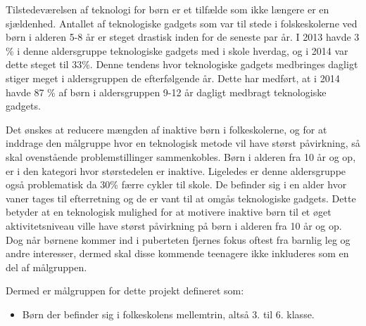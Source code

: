 Tilstedeværelsen af teknologi for børn er et tilfælde som ikke længere er en sjældenhed. Antallet af teknologiske gadgets som var til stede i folskeskolerne ved børn i alderen 5-8 år er steget drastisk inden for de seneste par år. I 2013 havde 3 \% i denne aldersgruppe teknologiske gadgets med i skole hverdag, og i 2014 var dette steget til 33\%. Denne tendens hvor teknologiske gadgets medbringes dagligt stiger meget i aldersgruppen de efterfølgende år. Dette har medført, at i 2014 havde 87 \% af børn i aldersgruppen 9-12 år dagligt medbragt teknologiske gadgets. \citep{GjensidigeForsikring2014}

Det ønskes at reducere mængden af inaktive børn i folkeskolerne, og for at inddrage den målgruppe hvor en teknologisk metode vil have størst påvirkning, så skal ovenstående problemstillinger sammenkobles. Børn i alderen fra 10 år og op, er i den kategori hvor størstedelen er inaktive. Ligeledes er denne aldersgruppe også problematisk da 30\% færre cykler til skole. De befinder sig i en alder hvor vaner tages til efterretning og de er vant til at omgås teknologiske gadgets. Dette betyder at en teknologisk mulighed for at motivere inaktive børn til et øget aktivitetsniveau ville have størst påvirkning på børn i alderen fra 10 år og op. Dog når børnene kommer ind i puberteten fjernes fokus oftest fra barnlig leg og andre interesser, dermed skal disse kommende teenagere ikke inkluderes som en del af målgruppen. 

Dermed er målgruppen for dette projekt defineret som: 

\begin{itemize}
\item Børn der befinder sig i folkeskolens mellemtrin, altså 3. til 6. klasse.
\end{itemize}